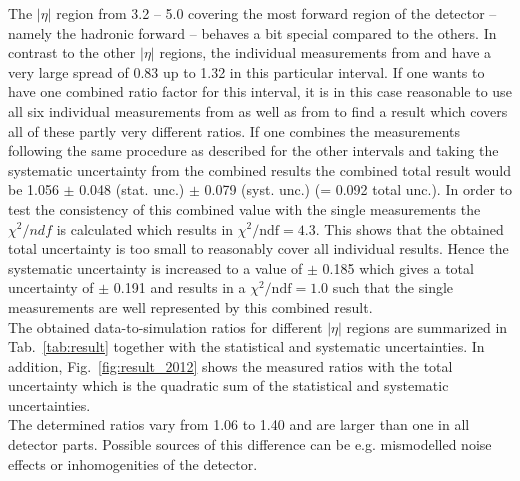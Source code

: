 The $|\eta|$ region from 3.2 -- 5.0 covering the most forward region of the detector -- namely the hadronic forward -- behaves a bit special compared to the others. In contrast to the other $|\eta|$ regions, the individual measurements from \pythia and \herwig have a very large spread of 0.83 up to 1.32 in this particular interval. If one wants to have one combined ratio factor for this interval, it is in this case reasonable to use all six individual measurements from \pythia as well as from \herwig to find a result which covers all of these partly very different ratios. If one combines the measurements following the same procedure as described for the other intervals and taking the systematic uncertainty from the combined \pythia results the combined total result would be 1.056 $\pm$ 0.048 (stat. unc.) $\pm$ 0.079 (syst. unc.) (= 0.092 total unc.). In order to test the consistency of this combined value with the single measurements the $\chi^2/ndf$ is calculated which results in  $\chi^2/\mathrm{ndf} = 4.3$. This shows that the obtained total uncertainty is too small to reasonably cover all individual results. Hence the systematic uncertainty is increased to a value of $\pm$ 0.185 which gives a total uncertainty of $\pm$ 0.191 and results in a $\chi^2/\mathrm{ndf} = 1.0$ such that the single measurements are well represented by this combined result.\\
The obtained data-to-simulation ratios for different $|\eta|$ regions are summarized in Tab.~\ref{tab:result} together with the statistical and systematic uncertainties. In addition, Fig.~\ref{fig:result_2012} shows the measured ratios with the total uncertainty which is the quadratic sum of the statistical and systematic uncertainties. \\
The determined ratios vary from 1.06 to 1.40 and are larger than one in all detector parts. Possible sources of this difference can be e.g. mismodelled noise effects or inhomogenities of the detector.

